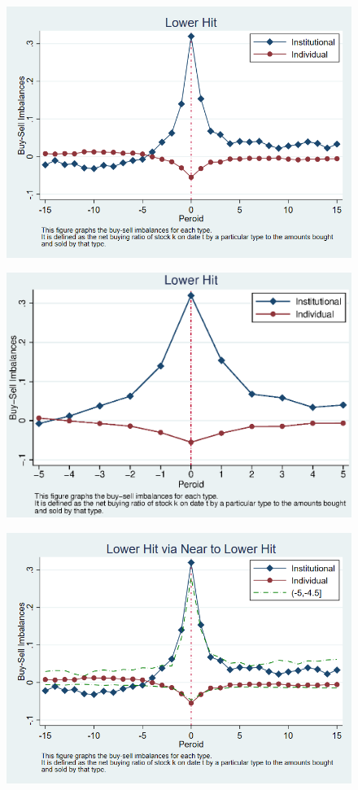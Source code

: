 \documentclass[12pt]{article}
\begin{document}
\begin{figure}[htbp]
\centering
\includegraphics[width=0.7\linewidth]{LI}
\caption{}
\label{fig:li}
\end{figure}
\begin{figure}[htbp]
\centering
\includegraphics[width=0.7\linewidth]{LI2.eps}
\caption{}
\label{fig:li2}
\end{figure}


\begin{figure}[htbp]
\centering
\includegraphics[width=0.7\linewidth]{CLI}
\caption{}
\label{fig:cli}
\end{figure}
\end{document}
